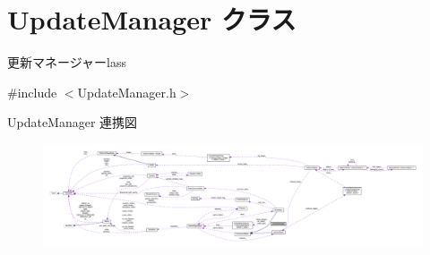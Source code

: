 \hypertarget{class_update_manager}{}\section{Update\+Manager クラス}
\label{class_update_manager}


更新マネージャーlass  




{\ttfamily \#include $<$Update\+Manager.\+h$>$}



Update\+Manager 連携図\nopagebreak
\begin{figure}[H]
\begin{center}
\leavevmode
\includegraphics[width=350pt]{class_update_manager__coll__graph}
\end{center}
\end{figure}
